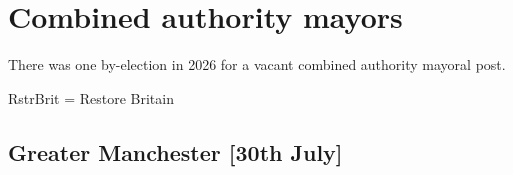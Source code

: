 \documentclass[a4paper,openany]{book}
\begin{document}
%
%

\section{Combined authority mayors}

There was one by-election in 2026 for a vacant combined authority mayoral post.

RstrBrit = Restore Britain

\subsection*{Greater Manchester \hspace*{\fill}\nolinebreak[1]%
	\enspace\hspace*{\fill}
	[30th July]}

\end{document}
